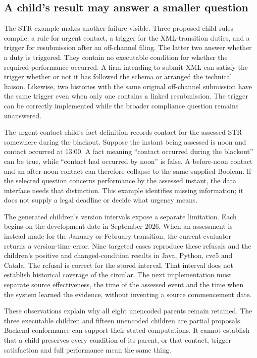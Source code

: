 \documentclass[12pt,a4paper,oneside,openany]{book}
\begin{document}
\subsection{A child's result may answer a smaller question}

The STR example makes another failure visible. Three proposed child rules
compile: a rule for urgent contact, a trigger for the XML-transition duties,
and a trigger for resubmission after an off-channel filing. The latter two
answer whether a duty is triggered. They contain no executable condition for
whether the required performance occurred. A firm intending to submit XML can
satisfy the trigger whether or not it has followed the schema or arranged the
technical liaison. Likewise, two histories with the same original off-channel
submission have the same trigger even when only one contains a linked
resubmission. The trigger can be correctly implemented while the broader
compliance question remains unanswered.

The urgent-contact child's fact definition records contact for the assessed STR
somewhere during the blackout. Suppose the instant being assessed is noon and
contact occurred at 13:00. A fact meaning ``contact occurred during the blackout''
can be true, while ``contact had occurred by noon'' is false. A before-noon
contact and an after-noon contact can therefore collapse to the same supplied
Boolean. If the selected question concerns performance by the assessed instant,
the data interface needs that distinction. This example identifies missing
information; it does not supply a legal deadline or decide what urgency means.

The generated children's version intervals expose a separate limitation. Each
begins on the development date in September 2026. When an assessment is instead
made for the January or February transition, the current evaluator returns a
version-time error. Nine targeted cases reproduce these refusals and the
children's positive and changed-condition results in Java, Python, cvc5 and
Catala. The refusal is correct for the stored interval. That interval does not
establish historical coverage of the circular. The next implementation must
separate source effectiveness, the time of the assessed event and the time when
the system learned the evidence, without inventing a source commencement date.

These observations explain why all eight unencoded parents remain retained.
The three executable children and fifteen unencoded children are partial
proposals. Backend conformance can support their stated computations. It cannot
establish that a child preserves every condition of its parent, or that contact,
trigger satisfaction and full performance mean the same thing.
\end{document}
